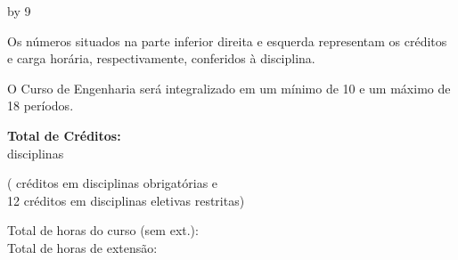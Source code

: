 \documentclass[a4paper, landscape]{article}
\newcounter{cred}
\newcounter{thoras}
\newcounter{tdisciplinas}
\begin{document}
\setcounter{haula}{\the\value{thoras}}
\setcounter{hextensao}{\the\value{thoras}}
\divide\value{hextensao} by 9
\addtocounter{thoras}{\the\value{hextensao}}
\addtocounter{hextensao}{1} %

\vspace{-4mm}
\setlength\parindent{0pt}

\begin{multicols}{4}
  \vfill
  Os números situados na parte inferior direita e esquerda representam os créditos e carga horária, respectivamente, conferidos à disciplina.

  
  \columnbreak
  O Curso de Engenharia será integralizado em um mínimo de 10 e um máximo de 18 períodos.

  \columnbreak
  \textbf{Total de Créditos:} \the\value{cred}\\
   \the\value{tdisciplinas} disciplinas\\
  \addtocounter{cred}{-12}
  (\the\value{cred} créditos em disciplinas obrigatórias e\\ 12 créditos em disciplinas eletivas restritas)

  \columnbreak
  Total de horas do curso (sem ext.): \the\value{haula}\\
  Total de horas de extensão: \the\value{hextensao}

  
\end{multicols}
\end{document}
